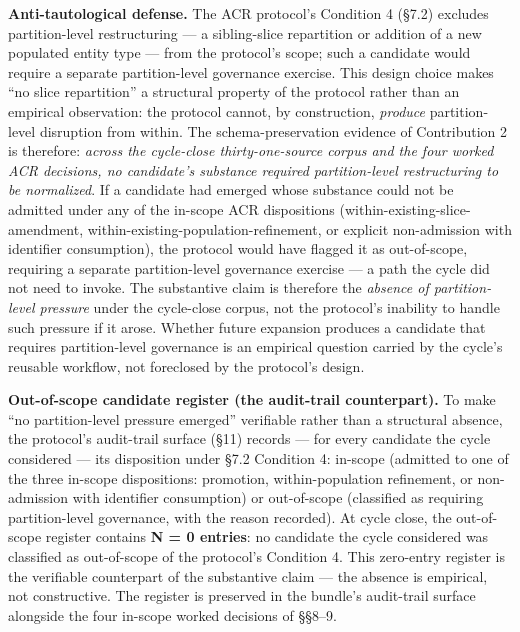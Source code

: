 \documentclass[
]{article}
\begin{document}
\textbf{Anti-tautological defense.} The ACR protocol's Condition 4
(§7.2) excludes partition-level restructuring --- a sibling-slice
repartition or addition of a new populated entity type --- from the
protocol's scope; such a candidate would require a separate
partition-level governance exercise. This design choice makes ``no slice
repartition'' a structural property of the protocol rather than an
empirical observation: the protocol cannot, by construction,
\emph{produce} partition-level disruption from within. The
schema-preservation evidence of Contribution 2 is therefore:
\emph{across the cycle-close thirty-one-source corpus and the four
worked ACR decisions, no candidate's substance required partition-level
restructuring to be normalized}. If a candidate had emerged whose
substance could not be admitted under any of the in-scope ACR
dispositions (within-existing-slice-amendment,
within-existing-population-refinement, or explicit non-admission with
identifier consumption), the protocol would have flagged it as
out-of-scope, requiring a separate partition-level governance exercise
--- a path the cycle did not need to invoke. The substantive claim is
therefore the \emph{absence of partition-level pressure} under the
cycle-close corpus, not the protocol's inability to handle such pressure
if it arose. Whether future expansion produces a candidate that requires
partition-level governance is an empirical question carried by the
cycle's reusable workflow, not foreclosed by the protocol's design.

\textbf{Out-of-scope candidate register (the audit-trail counterpart).}
To make ``no partition-level pressure emerged'' verifiable rather than a
structural absence, the protocol's audit-trail surface (§11) records ---
for every candidate the cycle considered --- its disposition under §7.2
Condition 4: in-scope (admitted to one of the three in-scope
dispositions: promotion, within-population refinement, or non-admission
with identifier consumption) or out-of-scope (classified as requiring
partition-level governance, with the reason recorded). At cycle close,
the out-of-scope register contains \textbf{N = 0 entries}: no candidate
the cycle considered was classified as out-of-scope of the protocol's
Condition 4. This zero-entry register is the verifiable counterpart of
the substantive claim --- the absence is empirical, not constructive.
The register is preserved in the bundle's audit-trail surface alongside
the four in-scope worked decisions of §§8--9.
\end{document}
